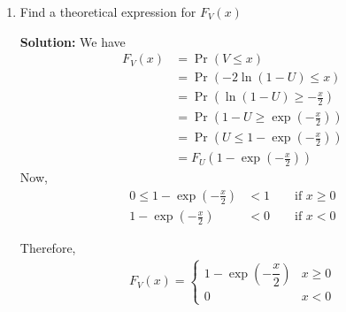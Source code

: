 \documentclass[journal,12pt,twocolumn]{IEEEtran}
\newcommand{\solution}{\noindent \textbf{Solution: }}
\providecommand{\pr}[1]{\ensuremath{\Pr\left(#1\right)}}
\providecommand{\brak}[1]{\ensuremath{\left(#1\right)}}
\numberwithin{equation}{section}
\renewcommand\thesection{\arabic{section}}
\begin{document}
\begin{enumerate}[label=\thesection.\arabic*,ref=\thesection.\theenumi]
	\item Find a theoretical expression for $F_V(x)$
	
	\solution We have
	\begin{align}
		F_V(x) &= \pr{V \le x} \\
		&= \pr{-2\ln\brak{1-U} \le x} \\
		&= \pr{\ln\brak{1-U} \ge -\frac{x}{2}} \\
		&= \pr{1-U \ge \exp\brak{-\frac{x}{2}}} \\
		&= \pr{U \le 1 - \exp\brak{-\frac{x}{2}}} \\
		&= F_U\brak{1 - \exp\brak{-\frac{x}{2}}}
	\end{align}
	Now,
	\begin{align}
		0 \le 1-\exp\brak{-\frac{x}{2}} &< 1 \qquad \text{if } x \ge 0	\\	
		1-\exp\brak{-\frac{x}{2}} &< 0 \qquad \text{if } x < 0	
	\end{align}
	
	Therefore,
	\begin{align}
		F_V(x) = 
		\begin{cases}
			1-\exp\brak{-\dfrac{x}{2}} & x \ge 0 \\
			0 & x < 0
		\end{cases}
	\end{align}
	
	\end{enumerate}
	
\end{document}
